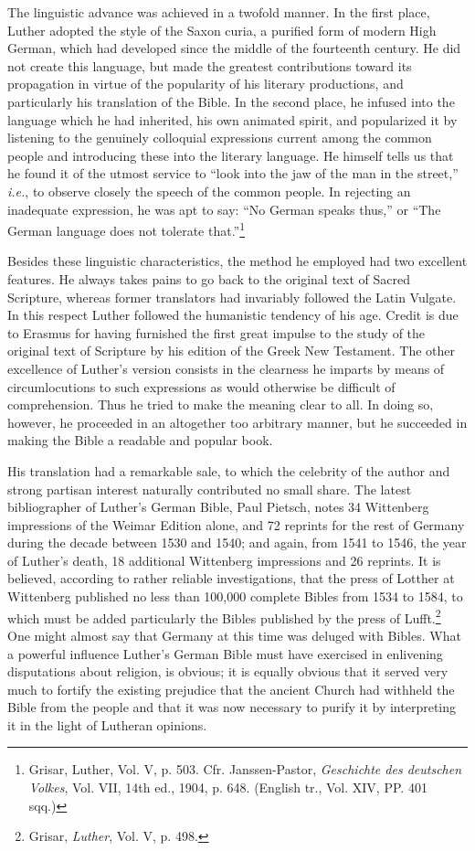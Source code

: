 The linguistic advance was achieved in a twofold manner. In the
first place, Luther adopted the style of the Saxon curia, a purified
form of modern High German, which had developed since the middle
of the fourteenth century. He did not create this language, but made
the greatest contributions toward its propagation in virtue of the
popularity of his literary productions, and particularly his translation
of the Bible. In the second place, he infused into the language which
he had inherited, his own animated spirit, and popularized it by
listening to the genuinely colloquial expressions current among the
common people and introducing these into the literary language. He
himself tells us that he found it of the utmost service to “look into
the jaw of the man in the street,” \textit{i.e.}, to observe closely the speech
of the common people. In rejecting an inadequate expression, he was
apt to say: “No German speaks thus,” or “The German language
does not tolerate that.”\footnote
{Grisar, Luther, Vol. V, p. 503. Cfr. Janssen-Pastor, \textit{Geschichte des deutschen Volkes},
Vol. VII, 14th ed., 1904, p. 648. (English tr., Vol. XIV, PP. 401 sqq.)}

Besides these linguistic characteristics, the method he employed had
two excellent features. He always takes pains to go back to the
original text of Sacred Scripture, whereas former translators had
invariably followed the Latin Vulgate. In this respect Luther followed
the humanistic tendency of his age. Credit is due to Erasmus
for having furnished the first great impulse to the study of the
original text of Scripture by his edition of the Greek New Testament.
The other excellence of Luther’s version consists in the clearness he
imparts by means of circumlocutions to such expressions as would
otherwise be difficult of comprehension. Thus he tried to make the
meaning clear to all. In doing so, however, he proceeded in an altogether
too arbitrary manner, but he succeeded in making the Bible a
readable and popular book.

His translation had a remarkable sale, to which the celebrity of
the author and strong partisan interest naturally contributed no small
share. The latest bibliographer of Luther’s German Bible, Paul Pietsch,
notes 34 Wittenberg impressions of the Weimar Edition alone, and
72 reprints for the rest of Germany during the decade between 1530
and 1540; and again, from 1541 to 1546, the year of Luther’s death,
18 additional Wittenberg impressions and 26 reprints. It is believed,
according to rather reliable investigations, that the press of Lotther
at Wittenberg published no less than 100,000 complete Bibles from
1534 to 1584, to which must be added particularly the Bibles published
by the press of Lufft.\footnote{Grisar, \textit{Luther}, Vol. V, p. 498.}
One might almost say that Germany
at this time was deluged with Bibles. What a powerful influence
Luther’s German Bible must have exercised in enlivening disputations
about religion, is obvious; it is equally obvious that it served
very much to fortify the existing prejudice that the ancient Church
had withheld the Bible from the people and that it was now necessary
to purify it by interpreting it in the light of Lutheran opinions.

